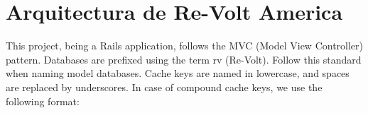 \chapter{Arquitectura de Re-Volt America}

This project, being a Rails application, follows the MVC (Model View Controller) pattern.
Databases are prefixed using the term rv (Re-Volt). Follow this standard when naming model databases.
Cache keys are named in lowercase, and spaces are replaced by underscores. In case of compound cache keys, we use the following format:

